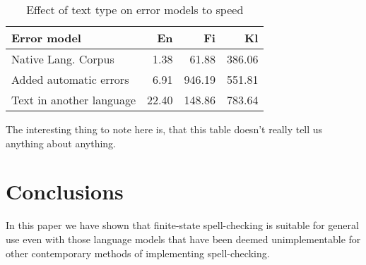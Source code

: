 \documentclass[11pt]{article}
\begin{document}
\begin{table}[h]
\begin{center}
\begin{scriptsize}
\begin{tabular}{|l|rrr|}
\hline
\bf Error model & \bf En & \bf Fi & \bf Kl  \\ 
\hline
\hline
Native Lang. Corpus &
1.38&61.88&386.06
\\
Added automatic errors &
6.91&946.19&551.81
\\
Text in another language &
22.40&148.86&783.64
\\
\end{tabular}
\end{scriptsize}
\end{center}
\caption{\label{table:language-vs-text-type} Effect of text type on
error models to speed}
\end{table}

The interesting thing to note here is, that this table doesn't really tell us
anything about anything. 


\section{Conclusions}
\label{sec:conclusions}

In this paper we have shown that finite-state spell-checking is suitable for
general use even with those language models that have been deemed
unimplementable for other contemporary methods of implementing spell-checking.





\end{document}
